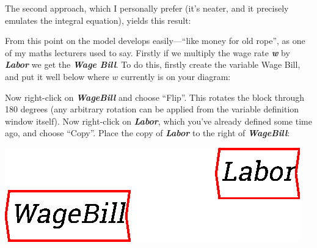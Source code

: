 The second approach, which I personally prefer (it's neater, and it
precisely emulates the integral equation), yields this result: 

\begin{center}
\end{center}

From this point on the model develops easily---``like money for old
rope'', as one of my maths lecturers used to say. Firstly if we
multiply the wage rate {\bf\em w} by {\bf\em Labor} we get the {\em\bf
Wage Bill}. To do this,
firstly create the variable Wage Bill, and put it well below where $w$
currently is on your diagram: 

\begin{center}
\end{center}

Now right-click on {\bf\em WageBill} and choose ``Flip''. This rotates
the block through 180 degrees (any arbitrary rotation can be applied
from the variable definition window itself). Now right-click on
{\bf\em Labor}, which you've already defined some time ago, and choose
``Copy''. Place the copy of {\bf\em Labor} to the right of {\bf\em
WageBill}:

\begin{center}
\includegraphics{images/NewItem98.eps}
\end{center}

